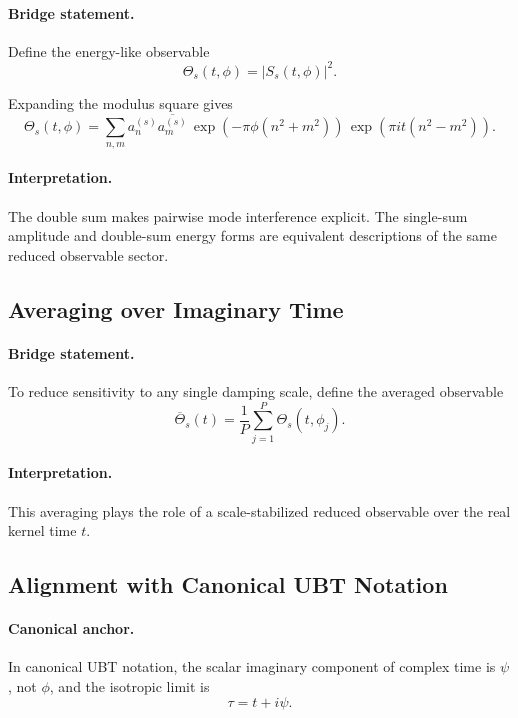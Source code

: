 \documentclass[11pt,a4paper]{article}
\begin{document}
\paragraph{Bridge statement.}
Define the energy-like observable
\begin{equation}
\Theta_s(t,\phi) = \left|S_s(t,\phi)\right|^2.
\end{equation}

Expanding the modulus square gives
\begin{equation}
\Theta_s(t,\phi)
=
\sum_{n,m}
a_n^{(s)}\overline{a_m^{(s)}}\,
\exp\!\left(-\pi \phi (n^2+m^2)\right)\,
\exp\!\left(\pi i t (n^2-m^2)\right).
\end{equation}

\paragraph{Interpretation.}
The double sum makes pairwise mode interference explicit. The single-sum amplitude and double-sum energy forms are equivalent descriptions of the same reduced observable sector.

\subsection{Averaging over Imaginary Time}

\paragraph{Bridge statement.}
To reduce sensitivity to any single damping scale, define the averaged observable
\begin{equation}
\overline{\Theta}_s(t)
=
\frac{1}{P}\sum_{j=1}^{P}\Theta_s(t,\phi_j).
\end{equation}

\paragraph{Interpretation.}
This averaging plays the role of a scale-stabilized reduced observable over the real kernel time $t$.

\subsection{Alignment with Canonical UBT Notation}

\paragraph{Canonical anchor.}
In canonical UBT notation, the scalar imaginary component of complex time is $\psi$, not $\phi$, and the isotropic limit is
\begin{equation}
\tau = t + i\psi.
\end{equation}
\end{document}

